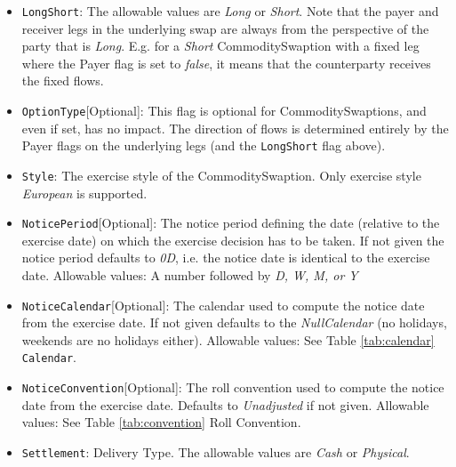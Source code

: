 \begin{itemize}
\item \lstinline!LongShort!: The allowable values are \emph{Long} or \emph{Short}. Note that the payer and receiver legs in the underlying swap are always from the perspective of the party that is \emph{Long}. E.g. for a \emph{Short} CommoditySwaption with a fixed leg where the Payer flag is set to \emph{false}, it means that the counterparty receives the fixed flows.  


\item \lstinline!OptionType![Optional]: This flag is optional for CommoditySwaptions, and even if set, has no impact. The direction of flows is determined entirely by the Payer flags on the underlying legs (and the \lstinline!LongShort! flag above).

\item  \lstinline!Style!: The exercise style of the CommoditySwaption. Only exercise style \emph{European} is supported.

\item \lstinline!NoticePeriod![Optional]: The notice period defining the date (relative to the exercise date) on which the exercise
  decision has to be taken. If not given the notice period defaults to \emph{0D}, i.e. the notice date is identical to the
  exercise date. Allowable values: A number followed by \emph{D, W, M, or Y}

\item \lstinline!NoticeCalendar![Optional]: The calendar used to compute the notice date from the exercise date. If not given
  defaults to the \emph{NullCalendar} (no holidays, weekends are no holidays either). Allowable values: See Table \ref{tab:calendar} \lstinline!Calendar!.

\item \lstinline!NoticeConvention![Optional]: The roll convention used to compute the notice date from the exercise date. Defaults to
  \emph{Unadjusted} if not given. Allowable values: See Table \ref{tab:convention} Roll Convention.

\item  \lstinline!Settlement!: Delivery Type. The allowable values are \emph{Cash} or \emph{Physical}.



\end{itemize}
